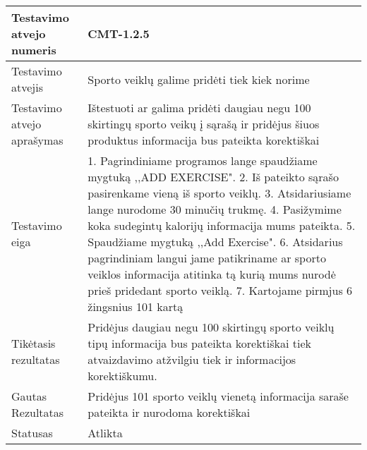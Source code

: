 \documentclass[oneside]{VUMIFPSkursinis}
\begin{document}
\begin{center}
    \begin{tabular}{ |p{5cm}|p{13cm}|}
    \hline
        Testavimo atvejo numeris & CMT-1.2.5  \\ \hline
        Testavimo atvejis & Sporto veiklų galime pridėti tiek kiek norime  \\ \hline
        Testavimo atvejo aprašymas & Ištestuoti ar galima pridėti daugiau negu 100 skirtingų sporto veikų į sąrašą ir pridėjus šiuos produktus informacija bus pateikta korektiškai \\ \hline
        Testavimo eiga &  1. Pagrindiniame programos lange spaudžiame mygtuką ,,ADD EXERCISE". 
				2. Iš pateikto sąrašo pasirenkame vieną iš sporto veiklų. 
				3. Atsidariusiame lange nurodome 30 minučių trukmę.
				4. Pasižymime koka sudegintų kalorijų informacija mums pateikta. 
				5. Spaudžiame mygtuką ,,Add Exercise".
				6. Atsidarius pagrindiniam langui jame patikriname ar sporto veiklos informacija atitinka tą kurią mums nurodė prieš pridedant sporto veiklą.
				7. Kartojame pirmjus 6 žingsnius 101 kartą \\ \hline
        Tikėtasis rezultatas & Pridėjus daugiau negu 100 skirtingų sporto veiklų tipų informacija bus pateikta korektiškai tiek atvaizdavimo atžvilgiu tiek ir informacijos korektiškumu.\\ \hline
        Gautas Rezultatas & Pridėjus 101 sporto veiklų vienetą informacija saraše pateikta ir nurodoma korektiškai  \\ \hline
        Statusas & Atlikta  \\ \hline
    \hline
    \end{tabular}
\end{center}
\end{document}
